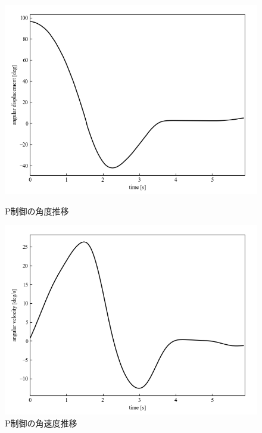\begin{figure}[h]
	\centering
	\begin{minipage}{0.43\columnwidth}
	  \centering
	  \includegraphics[width=\columnwidth]{./figure/Pdeg.png}
	  \caption{P制御の角度推移}
	  \label{fig:Pdeg}
	\end{minipage}
	\hspace{5mm}
	\begin{minipage}{0.43\columnwidth}
	  \centering
	  \includegraphics[width=\columnwidth]{./figure/Pdegpers.png}
	  \caption{P制御の角速度推移}
	  \label{fig:Pdegpers}
	\end{minipage}
  \end{figure}

